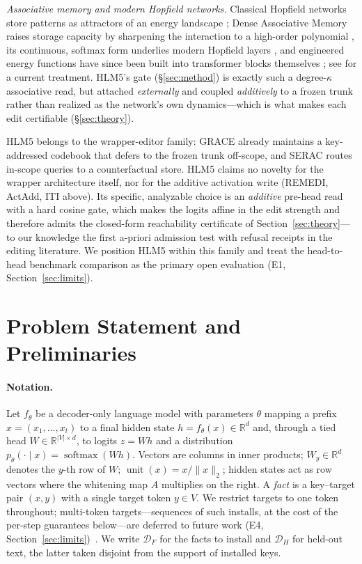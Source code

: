 \documentclass[11pt]{article}
\theoremstyle{remark}
\DeclareMathOperator{\softmax}{softmax}
\DeclareMathOperator{\unit}{unit}
\newcommand{\R}{\mathbb{R}}
\newcommand{\Df}{\mathcal{D}_F}
\newcommand{\Dh}{\mathcal{D}_H}
\begin{document}
\emph{Associative memory and modern Hopfield networks.} Classical Hopfield networks
store patterns as attractors of an energy landscape \citep{hopfield1982neural};
Dense Associative Memory raises storage capacity by sharpening the interaction to a
high-order polynomial \citep{krotov2016dense, krotov2021large}, its continuous,
softmax form underlies modern Hopfield layers \citep{ramsauer2020hopfield}, and
engineered energy functions have since been built into transformer blocks
themselves \citep{hoover2023energy}; see \citet{krotov2025modern} for a current
treatment. HLM5's
gate (\S\ref{sec:method}) is exactly such a degree-$\kappa$ associative read, but
attached \emph{externally} and coupled \emph{additively} to a frozen trunk rather
than realized as the network's own dynamics---which is what makes each edit
certifiable (\S\ref{sec:theory}).

HLM5 belongs to the wrapper-editor family: GRACE already maintains a
key-addressed codebook that defers to the frozen trunk off-scope, and SERAC
routes in-scope queries to a counterfactual store. HLM5 claims no novelty for
the wrapper architecture itself, nor for the additive activation write
(REMEDI, ActAdd, ITI above). Its specific, analyzable choice is an \emph{additive}
pre-head read with a hard cosine gate, which makes the logits affine in the edit
strength and therefore admits the closed-form reachability certificate of
Section~\ref{sec:theory}---to our knowledge the first a-priori admission test
with refusal receipts in the editing literature. We position HLM5 within this
family and treat the head-to-head benchmark comparison as the primary open
evaluation (E1, Section~\ref{sec:limits}).

\section{Problem Statement and Preliminaries}
\label{sec:prelim}

\paragraph{Notation.}
Let $f_\theta$ be a decoder-only language model with parameters $\theta$ mapping a
prefix $x=(x_1,\dots,x_t)$ to a final hidden state $h=f_\theta(x)\in\R^{d}$ and,
through a tied head $W\in\R^{|V|\times d}$, to logits $z=Wh$ and a distribution
$p_\theta(\cdot\mid x)=\softmax(Wh)$. Vectors are columns in inner products;
$W_y\in\R^{d}$ denotes the $y$-th row of $W$; $\unit(x)=x/\lVert x\rVert_2$;
hidden states act as row vectors where the whitening map $A$ multiplies on the
right. A \emph{fact} is a key--target pair $(x,y)$
with a single target token $y\in V$. We restrict targets to one token throughout;
multi-token targets---sequences of such installs, at the cost of the per-step
guarantees below---are deferred to future work (E4,
Section~\ref{sec:limits})~\citep{jiang2025anyedit}. We write $\Df$ for the facts to install and
$\Dh$ for held-out text, the latter taken disjoint from the support of installed
keys.
\end{document}
